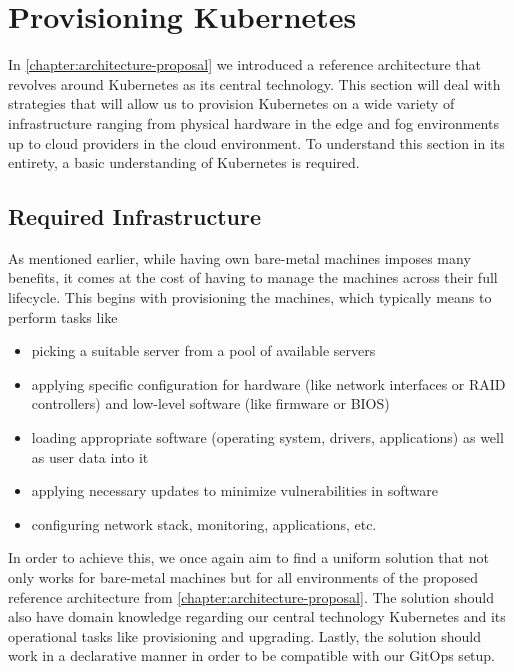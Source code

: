 \section{Provisioning Kubernetes}
\label{section:bare-metal-provisioning}
    In \autoref{chapter:architecture-proposal} we introduced a reference architecture that revolves around Kubernetes as its central technology. This section will deal with strategies that will allow us to provision Kubernetes on a wide variety of infrastructure ranging from physical hardware in the edge and fog environments up to cloud providers in the cloud environment. To understand this section in its entirety, a basic understanding of Kubernetes is required.

    
    \subsection{Required Infrastructure}
    \label{subsection:provisioning}
    As mentioned earlier, while having own bare-metal machines imposes many benefits, it comes at the cost of having to manage the machines across their full lifecycle. This begins with provisioning the machines, which typically means to perform tasks like
    
    \begin{itemize}
        \item picking a suitable server from a pool of available servers
        \item applying specific configuration for hardware (like network interfaces or RAID controllers) and low-level software (like firmware or BIOS)
        \item loading appropriate software (operating system, drivers, applications) as well as user data into it
        \item applying necessary updates to minimize vulnerabilities in software
        \item configuring network stack, monitoring, applications, etc.\ \cite{building_future_on_metal}
    \end{itemize}

    \noindent In order to achieve this, we once again aim to find a uniform solution that not only works for bare-metal machines but for all environments of the proposed reference architecture from \autoref{chapter:architecture-proposal}. The solution should also have domain knowledge regarding our central technology Kubernetes and its operational tasks like provisioning and upgrading. Lastly, the solution should work in a declarative manner in order to be compatible with our GitOps setup. \newline
    
